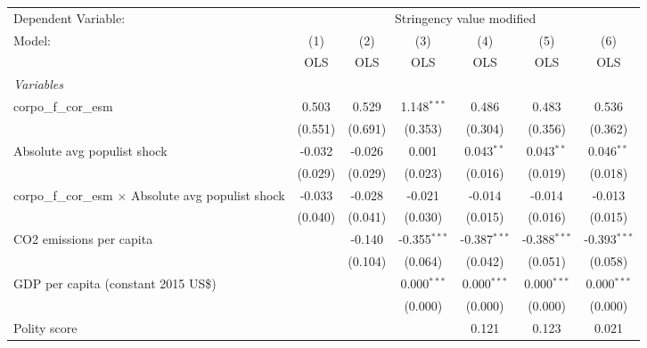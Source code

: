
\begingroup
\centering
\begin{tabular}{lcccccc}
   \toprule
   Dependent Variable: & \multicolumn{6}{c}{Stringency value modified}\\
   Model:                                                      & (1)     & (2)     & (3)            & (4)            & (5)            & (6)\\  
                                                               &  OLS    & OLS     & OLS            & OLS            & OLS            & OLS\\  
   \midrule
   \emph{Variables}\\
   corpo\_f\_cor\_esm                                          & 0.503   & 0.529   & 1.148$^{***}$  & 0.486          & 0.483          & 0.536\\   
                                                               & (0.551) & (0.691) & (0.353)        & (0.304)        & (0.356)        & (0.362)\\   
   Absolute avg populist shock                                 & -0.032  & -0.026  & 0.001          & 0.043$^{**}$   & 0.043$^{**}$   & 0.046$^{**}$\\   
                                                               & (0.029) & (0.029) & (0.023)        & (0.016)        & (0.019)        & (0.018)\\   
   corpo\_f\_cor\_esm $\times$ Absolute avg populist shock     & -0.033  & -0.028  & -0.021         & -0.014         & -0.014         & -0.013\\   
                                                               & (0.040) & (0.041) & (0.030)        & (0.015)        & (0.016)        & (0.015)\\   
   CO2 emissions per capita                                    &         & -0.140  & -0.355$^{***}$ & -0.387$^{***}$ & -0.388$^{***}$ & -0.393$^{***}$\\   
                                                               &         & (0.104) & (0.064)        & (0.042)        & (0.051)        & (0.058)\\   
   GDP per capita (constant 2015 US\$)                         &         &         & 0.000$^{***}$  & 0.000$^{***}$  & 0.000$^{***}$  & 0.000$^{***}$\\   
                                                               &         &         & (0.000)        & (0.000)        & (0.000)        & (0.000)\\   
   Polity score                                                &         &         &                & 0.121          & 0.123          & 0.021\\   

\end{tabular}
